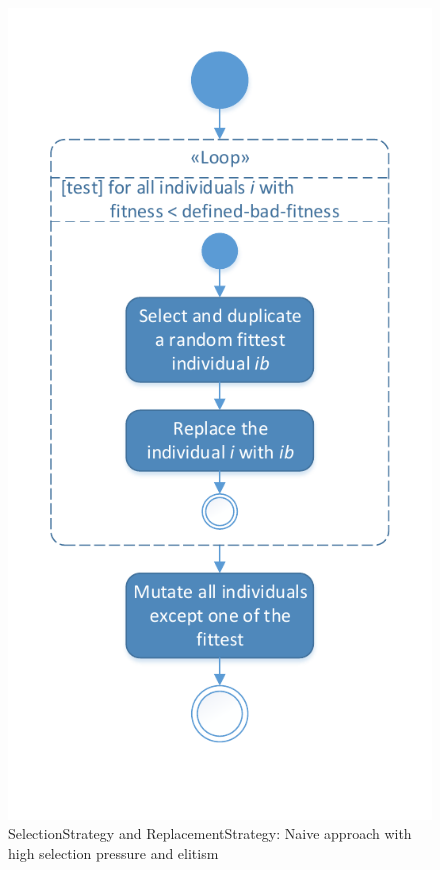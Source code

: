 \begin{figure}[!ht]
	\centering
	\includegraphics[scale=0.7, trim=0cm 1.5cm 0cm 0.5cm, clip=true]{Images/SelectionAndReplacement_Naive.pdf} 
	\caption{\Gls{SelectionStrategy} and \gls{ReplacementStrategy}: Naive approach with high selection pressure and elitism}
	\label{figSelectionAndReplacement_Naive}
\end{figure}

